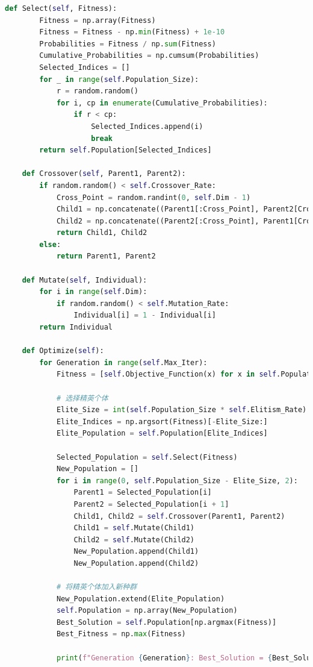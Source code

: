 \documentclass[withoutpreface,bwprint]{cumcmthesis} %
\begin{document}
\begin{appendices}
\begin{lstlisting}[language=python]
    def Select(self, Fitness):
        Fitness = np.array(Fitness)
        Fitness = Fitness - np.min(Fitness) + 1e-10
        Probabilities = Fitness / np.sum(Fitness)
        Cumulative_Probabilities = np.cumsum(Probabilities)
        Selected_Indices = []
        for _ in range(self.Population_Size):
            r = random.random()
            for i, cp in enumerate(Cumulative_Probabilities):
                if r < cp:
                    Selected_Indices.append(i)
                    break
        return self.Population[Selected_Indices]

    def Crossover(self, Parent1, Parent2):
        if random.random() < self.Crossover_Rate:
            Cross_Point = random.randint(0, self.Dim - 1)
            Child1 = np.concatenate((Parent1[:Cross_Point], Parent2[Cross_Point:]))
            Child2 = np.concatenate((Parent2[:Cross_Point], Parent1[Cross_Point:]))
            return Child1, Child2
        else:
            return Parent1, Parent2

    def Mutate(self, Individual):
        for i in range(self.Dim):
            if random.random() < self.Mutation_Rate:
                Individual[i] = 1 - Individual[i]
        return Individual

    def Optimize(self):
        for Generation in range(self.Max_Iter):
            Fitness = [self.Objective_Function(x) for x in self.Population]

            # 选择精英个体
            Elite_Size = int(self.Population_Size * self.Elitism_Rate)
            Elite_Indices = np.argsort(Fitness)[-Elite_Size:]
            Elite_Population = self.Population[Elite_Indices]

            Selected_Population = self.Select(Fitness)
            New_Population = []
            for i in range(0, self.Population_Size - Elite_Size, 2):
                Parent1 = Selected_Population[i]
                Parent2 = Selected_Population[i + 1]
                Child1, Child2 = self.Crossover(Parent1, Parent2)
                Child1 = self.Mutate(Child1)
                Child2 = self.Mutate(Child2)
                New_Population.append(Child1)
                New_Population.append(Child2)

            # 将精英个体加入新种群
            New_Population.extend(Elite_Population)
            self.Population = np.array(New_Population)
            Best_Solution = self.Population[np.argmax(Fitness)]
            Best_Fitness = np.max(Fitness)

            print(f"Generation {Generation}: Best_Solution = {Best_Solution}, Best Fitness = {Best_Fitness}")


\end{lstlisting}
\end{appendices}
\end{document}

